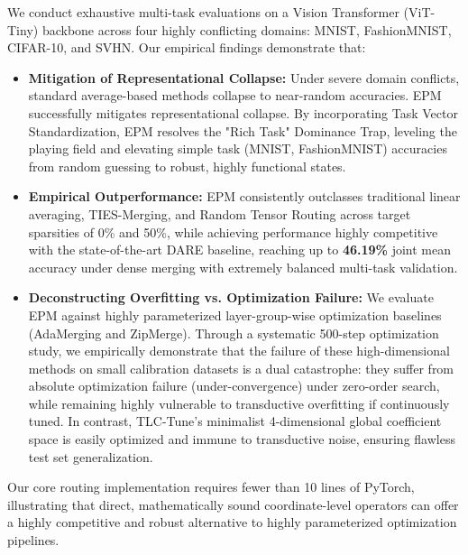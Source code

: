 We conduct exhaustive multi-task evaluations on a Vision Transformer (ViT-Tiny) backbone across four highly conflicting domains: MNIST, FashionMNIST, CIFAR-10, and SVHN. Our empirical findings demonstrate that:
\begin{itemize}
  \item \textbf{Mitigation of Representational Collapse:} Under severe domain conflicts, standard average-based methods collapse to near-random accuracies. EPM successfully mitigates representational collapse. By incorporating Task Vector Standardization, EPM resolves the "Rich Task" Dominance Trap, leveling the playing field and elevating simple task (MNIST, FashionMNIST) accuracies from random guessing to robust, highly functional states.
  \item \textbf{Empirical Outperformance:} EPM consistently outclasses traditional linear averaging, TIES-Merging, and Random Tensor Routing across target sparsities of 0\% and 50\%, while achieving performance highly competitive with the state-of-the-art DARE baseline, reaching up to \textbf{46.19\%} joint mean accuracy under dense merging with extremely balanced multi-task validation.
  \item \textbf{Deconstructing Overfitting vs. Optimization Failure:} We evaluate EPM against highly parameterized layer-group-wise optimization baselines (AdaMerging and ZipMerge). Through a systematic 500-step optimization study, we empirically demonstrate that the failure of these high-dimensional methods on small calibration datasets is a dual catastrophe: they suffer from absolute optimization failure (under-convergence) under zero-order search, while remaining highly vulnerable to transductive overfitting if continuously tuned. In contrast, TLC-Tune's minimalist 4-dimensional global coefficient space is easily optimized and immune to transductive noise, ensuring flawless test set generalization.
\end{itemize}
Our core routing implementation requires fewer than 10 lines of PyTorch, illustrating that direct, mathematically sound coordinate-level operators can offer a highly competitive and robust alternative to highly parameterized optimization pipelines.
